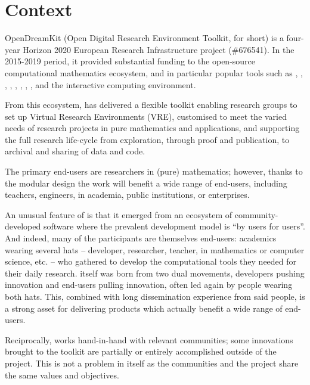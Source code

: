 \documentclass{deliverablereport}
\author{Nicolas M. Thiéry et al.}
\begin{document}
\enlargethispage{4ex}
\maketitle
\githubissuedescription
\clearpage
\tableofcontents
\clearpage


\section{Context}

OpenDreamKit (Open Digital Research Environment Toolkit, \ODK for
short) is a four-year Horizon 2020 European Research Infrastructure
project (\#676541). In the 2015-2019 period, it provided substantial funding to the open-source
computational mathematics ecosystem, and in particular popular tools
such as \Linbox, \MPIR, \Sage, \GAP, \PariGP, \LMFDB, \Singular,
\MathHub, and the \Jupyter interactive computing environment.

From this ecosystem, \ODK has delivered a flexible toolkit
enabling research groups to set up Virtual Research Environments
(VRE), customised to meet the varied needs of research projects in
pure mathematics and applications, and supporting the full research
life-cycle from exploration, through proof and publication, to
archival and sharing of data and code.

The primary end-users are researchers in (pure) mathematics; however,
thanks to the modular design the work will benefit a wide range of
end-users, including teachers, engineers, in academia, public
institutions, or enterprises.

An unusual feature of \ODK is that it emerged from an ecosystem of
community-developed software where the prevalent development model is
``by users for users''. And indeed, many of the \ODK participants are
themselves end-users: academics wearing several hats -- developer,
researcher, teacher, in mathematics or computer science, etc. -- who
gathered to develop the computational tools they needed for their daily
research. \ODK itself was born from two dual movements,
developers pushing innovation and end-users pulling innovation,
often led again by people wearing both hats. This, combined with long
dissemination experience from said people, is a strong asset for
delivering products which actually benefit a wide range of end-users.

Reciprocally, \ODK works hand-in-hand with relevant communities; some
innovations brought to the toolkit are partially or entirely
accomplished outside of the \ODK project. This is not a
problem in itself as the communities and the project share the same
values and objectives.
\end{document}
